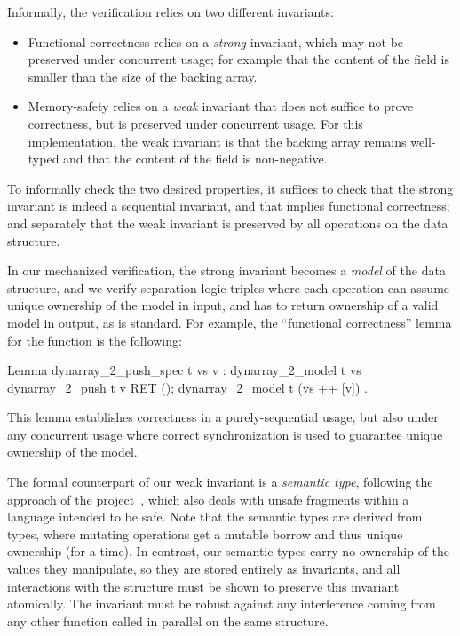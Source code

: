 Informally, the verification relies on two different invariants:
\begin{itemize}
\item Functional correctness relies on a \emph{strong} invariant,
  which may not be preserved under concurrent usage; for example that
  the content of the  field is smaller than the
  size of the backing array.
\item Memory-safety relies on a \emph{weak} invariant that does not
  suffice to prove correctness, but is preserved under concurrent
  usage. For this  implementation, the weak
  invariant is that the backing array remains well-typed and that the
  content of the  field is non-negative.
\end{itemize}
To informally check the two desired properties, it suffices to check
that the strong invariant is indeed a sequential invariant, and that
implies functional correctness; and separately that the weak invariant
is preserved by all operations on the data structure.

In our mechanized verification, the strong invariant becomes a \emph{model}
of the data structure, and we verify separation-logic triples where
each operation can assume unique ownership of the model in input, and
has to return ownership of a valid model in output, as is
standard. For example, the ``functional correctness'' lemma for the
 function is the following:

\begin{coqcode}
Lemma dynarray_2_push_spec t vs v :
  {{{ dynarray_2_model t vs }}}
    dynarray_2_push t v
  {{{ RET (); dynarray_2_model t (vs ++ [v]) }}}.
\end{coqcode}

This lemma establishes correctness in a purely-sequential usage, but
also under any concurrent usage where correct synchronization is used to
guarantee unique ownership of the model.

The formal counterpart of our weak invariant is a \emph{semantic type}, following the approach of the \RustBelt project~\citep{DBLP:journals/pacmpl/0002JKD18}, which also deals with unsafe fragments within a language intended to be safe. Note that the \RustBelt semantic types are derived from \Rust types, where mutating operations get a mutable borrow and thus unique ownership (for a time). In contrast, our semantic types carry no ownership of the values they manipulate, so they are stored entirely as invariants, and all interactions with the structure must be shown to preserve this invariant atomically. The invariant must be robust against any interference coming from any other function called in parallel on the same structure.

